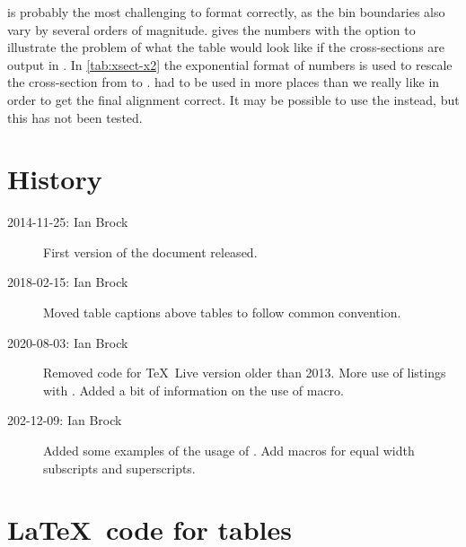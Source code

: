 \documentclass[REPORT=false, UKenglish]{atlasdoc}
\begin{document}
 is probably the most challenging to format
correctly, as the bin boundaries also vary by several orders of magnitude.
 gives the numbers with the option
 to illustrate the problem of what
the table would look like if the cross-sections are output in \unit{\pb}.
In \cref{tab:xsect-x2} the exponential format of
numbers is used to rescale the cross-section from \unit{\pb} to \unit{\nb}. 
 had to be used in more places than we
really like in order to get the final alignment correct.
It may be possible to use the  instead,
but this has not been tested.

\clearpage
\section*{History}

\begin{description}
\item[2014-11-25: Ian Brock] First version of the document released.
\item[2018-02-15: Ian Brock] Moved table captions above tables to follow common convention.
\item[2020-08-03: Ian Brock] Removed code for \TeX\ Live version older than 2013.
  More use of listings with .
  Added a bit of information on the use of  macro.
\item[202-12-09: Ian Brock] Added some examples of the usage of .
  Add macros for equal width subscripts and superscripts. 
\end{description}


\printbibliography
% 
% 

\clearpage
\appendix
\section{\LaTeX\ code for tables}
\label{sec:raw-data}
\end{document}
